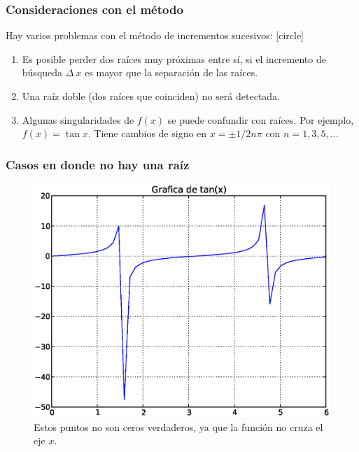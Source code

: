\begin{frame}
\frametitle{Consideraciones con el método}
Hay varios problemas con el método de incrementos sucesivos:
[circle]
\begin{enumerate}[<+->]
\item Es posible perder dos raíces muy próximas entre sí, si el incremento de búsqueda $\Delta \: x$ es mayor que la separación de las raíces.
\item Una raíz doble (dos raíces que coinciden) no será detectada.
\item Algunas singularidades de $f(x)$ se puede confundir con raíces. Por ejemplo, $f(x) = \tan x$. Tiene cambios de signo en $x = \pm 1/2 n\pi$ con $n = 1, 3, 5,\ldots$
\end{enumerate}
\end{frame}
\begin{frame}
\frametitle{Casos en donde no hay una raíz}
\begin{figure}
	\centering
	\includegraphics[scale=0.4]{Imagenes/raices05.eps}
	\caption{Estos puntos no son ceros verdaderos, ya que la función no cruza el eje $x$.}
\end{figure}
\end{frame}
